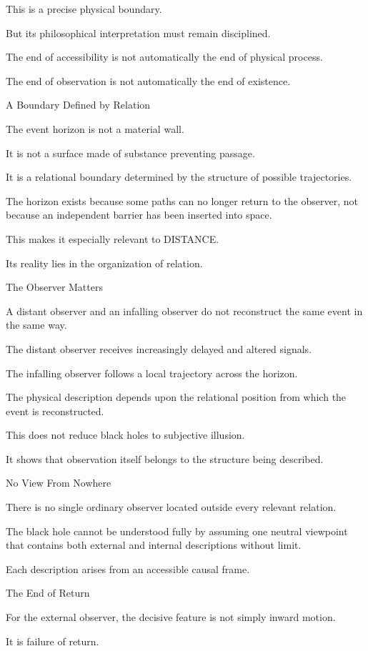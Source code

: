 This is a precise physical boundary.

But its philosophical interpretation must remain disciplined.

The end of accessibility is not automatically the end of physical process.

The end of observation is not automatically the end of existence.

A Boundary Defined by Relation

The event horizon is not a material wall.

It is not a surface made of substance preventing passage.

It is a relational boundary determined by the structure of possible trajectories.

The horizon exists because some paths can no longer return to the observer, not because an independent barrier has been inserted into space.

This makes it especially relevant to DISTANCE.

Its reality lies in the organization of relation.

The Observer Matters

A distant observer and an infalling observer do not reconstruct the same event in the same way.

The distant observer receives increasingly delayed and altered signals.

The infalling observer follows a local trajectory across the horizon.

The physical description depends upon the relational position from which the event is reconstructed.

This does not reduce black holes to subjective illusion.

It shows that observation itself belongs to the structure being described.

No View From Nowhere

There is no single ordinary observer located outside every relevant relation.

The black hole cannot be understood fully by assuming one neutral viewpoint that contains both external and internal descriptions without limit.

Each description arises from an accessible causal frame.

The End of Return

For the external observer, the decisive feature is not simply inward motion.

It is failure of return.

